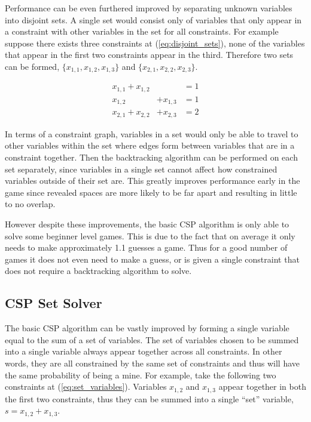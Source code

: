 \documentclass[letterpaper]{article}
\begin{document}
Performance can be even furthered improved by separating unknown variables into disjoint sets.  A single set would consist only of variables that only appear in a constraint with other variables in the set for all constraints.  For example suppose there exists three constraints at (\ref{eq:disjoint_sets}), none of the variables that appear in the first two constraints appear in the third.  Therefore two sets can be formed, $\{x_{1,1}, x_{1,2}, x_{1,3}\}$ and $\{x_{2,1}, x_{2,2}, x_{2,3}\}$.

\begin{equation}\label{eq:disjoint_sets}
\begin{aligned}
x_{1,1} + x_{1,2}& &= 1\\
x_{1,2} &+ x_{1,3} &= 1\\
x_{2,1} + x_{2,2} &+ x_{2,3} &= 2
\end{aligned}
\end{equation}

In terms of a constraint graph, variables in a set would only be able to travel to other variables within the set where edges form between variables that are in a constraint together.  Then the backtracking algorithm can be performed on each set separately, since variables in a single set cannot affect how constrained variables outside of their set are.  This greatly improves performance early in the game since revealed spaces are more likely to be far apart and resulting in little to no overlap.

However despite these improvements, the basic CSP algorithm is only able to solve some beginner level games.  This is due to the fact that on average it only needs to make approximately 1.1 guesses a game.  Thus for a good number of games it does not even need to make a guess, or is given a single constraint that does not require a backtracking algorithm to solve.

\subsection{CSP Set Solver}
The basic CSP algorithm can be vastly improved by forming a single variable equal to the sum of a set of variables.  The set of variables chosen to be summed into a single variable always appear together across all constraints.  In other words, they are all constrained by the same set of constraints and thus will have the same probability of being a mine.  For example, take the following two constraints at (\ref{eq:set_variables}).  Variables $x_{1,2}$ and $x_{1,3}$ appear together in both the first two constraints, thus they can be summed into a single ``set'' variable, $s = x_{1,2} + x_{1,3}$.
\end{document}
